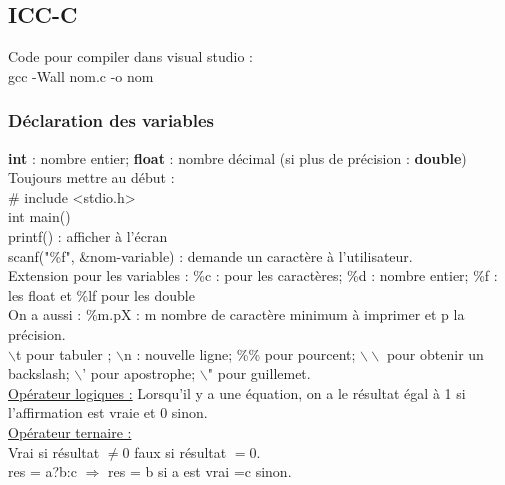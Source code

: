 \documentclass[../main.tex]{subfiles}
\begin{document}
\localtableofcontents
\subsection{ICC-C}
Code pour compiler dans visual studio :\\
gcc -Wall nom.c -o nom\\

\subsubsection{Déclaration des variables}
\textbf{int} : nombre entier; \textbf{float} : nombre décimal (si plus de précision : \textbf{double})\\
Toujours mettre au début : \\
\# include <stdio.h>\\
int main()\\
printf() : afficher à l'écran\\
scanf("\%f", \&nom-variable) : demande un caractère à l'utilisateur.\\

Extension pour les variables : \%c : pour les caractères; \%d : nombre entier; \%f : les float et \%lf pour les double\\
On a aussi : \%m.pX : m nombre de caractère minimum à imprimer et p la précision. \\
$\backslash$t pour tabuler ; $\backslash$n : nouvelle ligne; \%\% pour pourcent; $\backslash \backslash$ pour obtenir un backslash; $\backslash$' pour apostrophe; $\backslash$" pour guillemet.\\

\quad \underline{Opérateur logiques :}
Lorsqu'il y a une équation, on a le résultat égal à 1 si l'affirmation est vraie et 0 sinon.\\

\quad \underline{Opérateur ternaire :} \\
Vrai si résultat $\neq 0$ faux si résultat $=0$.\\
res = a?b:c $\Rightarrow$ res = b si a est vrai =c sinon.\\
\end{document}
